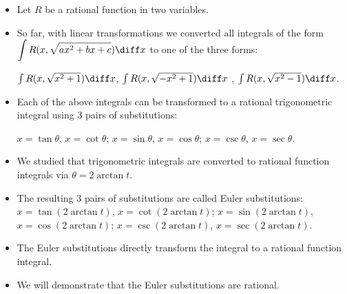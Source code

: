 
\begin{frame}
\begin{itemize}
\item Let $R$ be a rational function in two variables.
\item<2-> So far, with linear transformations we converted all integrals of the form $\displaystyle\int R(x, \sqrt{ax^2+bx+c})\diff x$ to one of the three forms:

\alert<4,9>{$\int R(x, \sqrt{x^2+1})\diff x$}, \alert<5,10>{$\int R(x, \sqrt{-x^2+1})\diff x$} , \alert<6,11>{$\int R(x, \sqrt{x^2-1}) \diff x$}.
\item<3-> Each of the above integrals can be transformed to a rational trigonometric integral using 3 pairs of substitutions:

\alert<4,9>{$x=\tan\theta $, $x=\cot \theta$;}  
\alert<5,10>{$x=\sin\theta $, $x=\cos \theta$;}
\alert<6,11>{$x=\csc\theta $, $x=\sec \theta$.}
\item<7-> We studied that trigonometric integrals are converted to rational function integrals via $\theta=2\arctan t$.
\item<8-> The resulting 3 pairs of substitutions are called Euler substitutions:
\alert<9,13>{$x=\tan (2\arctan t) $, $x=\cot (2\arctan t)$;}  
\alert<10,13>{$x=\sin(2\arctan t) $, $x=\cos (2\arctan t)$;}
\alert<11,13>{$x=\csc(2\arctan t) $, $x=\sec (2\arctan t)$.}
\item<12-> The Euler substitutions directly transform the integral to a rational function integral.
\item<13-> We will demonstrate that the Euler substitutions are \alert<13>{rational}.
\end{itemize}

\end{frame}

